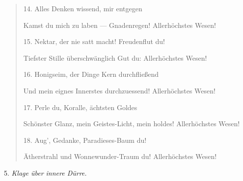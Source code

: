 \documentclass{article}
\begin{document}
\begin{quotation}\small
14. Alles Denken wissend, mir entgegen

Kamst du mich zu laben — Gnadenregen! Allerhöchstes Wesen!

\bigskip

15. Nektar, der nie satt macht! Freudenflut du!

Tiefster Stille überschwänglich Gut du: Allerhöchstes Wesen!

\bigskip

16. Honigseim, der Dinge Kern durchfließend

Und mein eignes Innerstes durchzuessend! Allerhöchstes Wesen!

\bigskip

17. Perle du, Koralle, ächtsten Goldes

Schönster Glanz, mein Geistes-Licht, mein holdes! Allerhöchstes Wesen!

\bigskip

18. Aug', Gedanke, Paradieses-Baum du!

Ätherstrahl und Wonnewunder-Traum du! Allerhöchstes Wesen!
\end{quotation}
\begin{center}
5. \emph{Klage über innere Dürre.}
\end{center}
\end{document}
